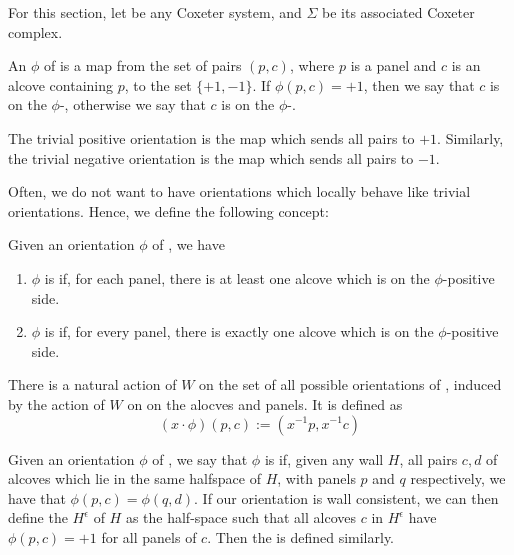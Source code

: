 \documentclass[12pt]{article}
\begin{document}
For this section, let \W be any Coxeter system, and $\Sigma$ be its associated Coxeter complex.

\begin{definition}
    An  $\phi$ of \sg is a map from the set of pairs $(p,c)$, where $p$ is a panel and $c$ is an alcove containing $p$, to the set $\{+1,-1\}$. If $\phi (p,c)=+1$, then we say that $c$ is on the $\phi$-, otherwise we say that $c$ is on the $\phi$-. 
\end{definition}


\begin{example}
    The trivial positive orientation is the map which sends all pairs to $+1$. Similarly, the trivial negative orientation is the map which sends all pairs to $-1$. 
\end{example}

Often, we do not want to have orientations which locally behave like trivial orientations. Hence, we define the following concept:

\begin{definition}
    Given an orientation $\phi$ of \sg, we have
    \begin{enumerate}
        \item $\phi$ is  if, for each panel, there is at least one alcove which is on the $\phi$-positive side.
        \item $\phi$ is  if, for every panel, there is exactly one alcove which is on the $\phi$-positive side.
    \end{enumerate}
\end{definition}


There is a natural action of $W$ on the set of all possible orientations of \sg, induced by the action of $W$ on on the alocves and panels. It is defined as 
\[(x\cdot\phi)(p,c):=(x^{-1}p,x^{-1}c)\]

\begin{definition}
    Given an orientation $\phi$ of \sg, we say that $\phi$ is  if, given any wall $H$, all pairs $c,d$ of alcoves which lie in the same halfspace of $H$, with panels $p$ and $q$ respectively, we have that $\phi(p,c)=\phi(q,d)$. If our orientation is wall consistent, we can then define the  $H^{\epsilon}$ of $H$ as the half-space such that all alcoves $c$ in $H^{\epsilon}$ have $\phi(p,c)=+1$ for all panels of $c$. Then the  is defined similarly.
\end{definition}
\end{document}
